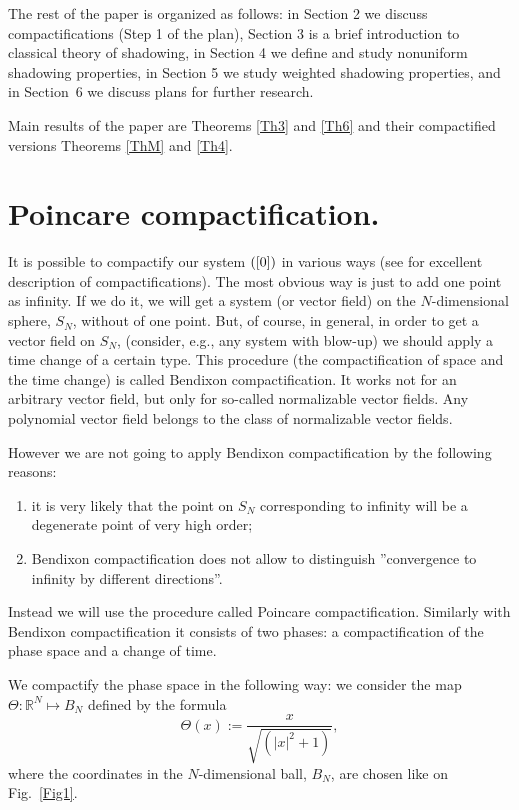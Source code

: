 \documentclass[11pt]{article}
\theoremstyle{Mystyle}
\begin{document}
The rest of the paper is organized as follows: in Section 2 we discuss compactifications (Step 1 of the plan), %
Section 3 is a brief introduction to classical theory of shadowing, in Section 4 we define and study nonuniform shadowing properties, in Section 5 we study weighted shadowing properties, and in Section~6 we discuss plans for further research.

Main results of the paper are Theorems \ref{Th3} and \ref{Th6} and their compactified versions Theorems \ref{ThM} and \ref{Th4}.

\section{Poincare compactification.}

It is possible to compactify our system $(\ref{0})$ in various ways (see \cite{Hell} for excellent description of compactifications). The most obvious way is just to add one point as infinity. If we do it, we will get a system (or vector field) on the $N$-dimensional sphere, $S_{N}$, without of one point. But, of course, in general, in order to get a vector field on $S_{N}$, (consider, e.g., any system with blow-up) we should apply a time change of a certain type. This procedure (the compactification of space and the time change) is called Bendixon compactification. It works not for an arbitrary vector field, but only for so-called normalizable vector fields. Any polynomial vector field belongs to the class of normalizable vector fields.

However we are not going to apply Bendixon compactification by the following reasons:
\begin{enumerate}
	\item it is very likely that the point on $S_N$ corresponding to infinity will be a degenerate point of very high order;
	\item Bendixon compactification does not allow to distinguish ''convergence to infinity by different directions''.
\end{enumerate}
Instead we will use the procedure called Poincare compactification. Similarly with Bendixon compactification it consists of two phases: a compactification of the phase space and a change of time.

We compactify the phase space in the following way: we consider the map $\Theta:\mathbb{R}^N\mapsto B_N$ defined by the formula
\begin{equation}
\label{CP}
\Theta(x) := \frac{x}{\sqrt{(|x|^2 + 1)}},
\end{equation}
where the coordinates in the $N$-dimensional ball, $B_N$, are chosen like on Fig.~\ref{Fig1}.
\end{document}
